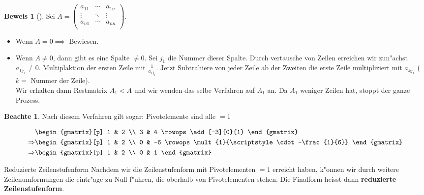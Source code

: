 \documentclass[oneside,fontsize=11pt,paper=a4,BCOR=0mm,DIV=12,automark,headsepline]{scrbook}
\theoremstyle{remark}
\theoremstyle{definition}
\newtheorem*{notte}{Beachte}
\theoremstyle{definition}
\newtheorem*{prof}{Beweis}
\theoremstyle{remark}
\begin{document}
\begin{prof}[]
	Sei \(A=
	\begin{pmatrix}
	a_{11} & \cdots & a_{1n} \\
	\vdots & \ddots & \vdots \\
	a_{n1} & \cdots & a_{nn} \\
	
	\end{pmatrix}\).
	\begin{itemize}
		\item Wenn \(A=0 \implies\) Bewiesen.
		\item Wenn \(A\not=0\), dann gibt es eine Spalte \(\not= 0\). Sei
		\(j_1\) die Nummer dieser Spalte. Durch vertausche von Zeilen erreichen wir
		zun"achst \(a_{1j_1}\not= 0\). Multiplaktion der ersten Zeile mit
		\(\frac{1}{a_{1j_1}}\). Jetzt Subtrahiere von jeder Zeile ab der Zweiten die erste
		Zeile multipliziert mit \(a_{kj_1}\) (\(k=\) Nummer der Zeile).\\
	
		Wir erhalten dann Restmatrix \(A_1<A\) und wir wenden das selbe Verfahren auf
		\(A_1\) an. Da \(A_1\) weniger Zeilen hat, stoppt der ganze Prozess.
	\end{itemize}
\begin{notte}
Nach diesem Verfahren gilt sogar: Pivotelemente sind alle \(=1\)
\end{notte}
\end{prof}


\begin{exa}
\begin{align*}
  & \begin{gmatrix}[p]
      1 & 2 \\
      3 & 4
      \rowops
      \add[-3]{0}{1}
    \end{gmatrix} \\
  \Rightarrow & \begin{gmatrix}[p]
      1 & 2 \\
      0 & -6
      \rowops
      \mult{1}{\scriptstyle\cdot-\frac{1}{6}}
    \end{gmatrix} \\
  \Rightarrow & \begin{gmatrix}[p]
      1 & 2 \\
      0 & 1
    \end{gmatrix}
\end{align*}
\end{exa}

\begin{definition}{Reduzierte Zeilenstufenform}{}
Nachdem wir die Zeilenstufenform mit Pivotelementen \(=1\) erreicht haben, k"onnen
wir durch weitere Zeilenumformungen die eintr"age zu Null f"uhren, die oberhalb
von Pivotelementen stehen. Die Finalform heisst dann \textbf{reduzierte
Zeilenstufenform}.
\end{definition}
\end{document}
